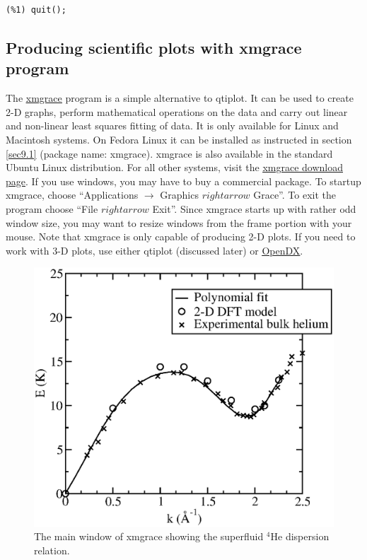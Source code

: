 \documentclass[byrevtex,amssymb,aps,pra,floatfix,letterpaper]{revtex4}
\begin{document}
\begin{verbatim}
(%1) quit();
\end{verbatim}

\subsection{Producing scientific plots with xmgrace program}

The \href{http://plasma-gate.weizmann.ac.il/Grace/}{\underline{xmgrace}} program is a simple alternative to qtiplot.
It can be used to create 2-D graphs, perform mathematical operations on the data and carry out linear and non-linear least squares fitting of data. It is only available for Linux and Macintosh systems. On Fedora Linux it can be installed as instructed in section \ref{sec9.1} (package name: xmgrace). xmgrace is also available in the standard Ubuntu Linux distribution. For all other systems, visit the \href{ftp://plasma-gate.weizmann.ac.il/pub/grace/}{\underline{xmgrace download page}}. If you use windows, you may have to buy a commercial package. To startup xmgrace, choose ``Applications $\rightarrow$ Graphics $rightarrow$ Grace''. To exit the program choose ``File $rightarrow$ Exit''. Since xmgrace starts up with rather odd window size, you may want to resize windows from the frame portion with your mouse. Note that xmgrace is only capable of producing 2-D plots. If you need to work with 3-D plots, use either qtiplot (discussed later) or \href{http://www.opendx.org/}{\underline{OpenDX}}.\\

\vspace*{0.25cm}
\begin{figure}[!htp]
\begin{center}
\includegraphics[scale=0.4]{xmgrace}
\caption{The main window of xmgrace showing the superfluid $^4$He dispersion relation.}
\label{xmgrace}
\end{center}
\end{figure}
\end{document}
